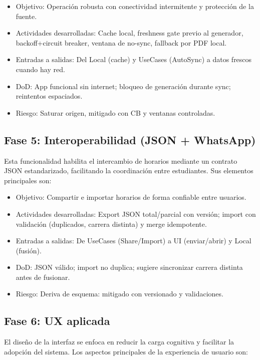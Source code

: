 \begin{itemize}
  \item Objetivo: Operación robusta con conectividad intermitente y protección de la fuente.
  \item Actividades desarrolladas: Cache local, freshness gate previo al generador, backoff+circuit breaker, ventana de no-sync, fallback por PDF local.
  \item Entradas a salidas: Del Local (cache) y UseCases (AutoSync) a datos frescos cuando hay red.
  \item DoD: App funcional sin internet; bloqueo de generación durante sync; reintentos espaciados.
  \item Riesgo: Saturar origen, mitigado con CB y ventanas controladas.
\end{itemize}

\subsection{Fase 5: Interoperabilidad (JSON + WhatsApp)}
Esta funcionalidad habilita el intercambio de horarios mediante un contrato JSON estandarizado, facilitando la coordinación entre estudiantes. Sus elementos principales son:

\begin{itemize}
  \item Objetivo: Compartir e importar horarios de forma confiable entre usuarios.
  \item Actividades desarrolladas: Export JSON total/parcial con versión; import con validación (duplicados, carrera distinta) y merge idempotente.
  \item Entradas a salidas: De UseCases (Share/Import) a UI (enviar/abrir) y Local (fusión).
  \item DoD: JSON válido; import no duplica; sugiere sincronizar carrera distinta antes de fusionar.
  \item Riesgo: Deriva de esquema: mitigado con versionado y validaciones.
\end{itemize}

\subsection{Fase 6: UX aplicada}
El diseño de la interfaz se enfoca en reducir la carga cognitiva y facilitar la adopción del sistema. Los aspectos principales de la experiencia de usuario son:

